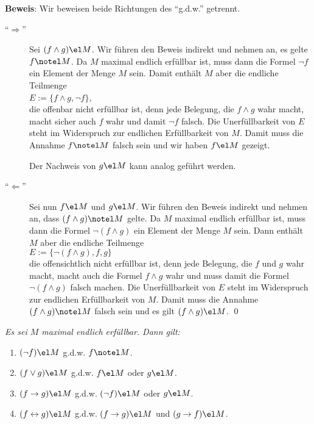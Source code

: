 \noindent
\textbf{Beweis}: Wir beweisen beide Richtungen des ``g.d.w.'' getrennt.
\begin{description}
\item[``$\Rightarrow$''] Sei $(f \wedge g) \el M$.  Wir f\"{u}hren den Beweis indirekt und
  nehmen an, es gelte $f \notel M$. Da
  $M$ maximal endlich erf\"{u}llbar ist, muss dann die Formel $\neg f$ ein Element der Menge
  $M$ sein.  Damit enth\"{a}lt $M$ aber die endliche Teilmenge 
  \\[0.2cm]
  \hspace*{1.3cm}
  $E := \{ f \wedge g, \neg f\}$, 
  \\[0.2cm]
  die offenbar nicht erf\"{u}llbar ist, denn jede Belegung, die $f \wedge g$ wahr macht, macht
  sicher auch $f$ wahr und damit $\neg f$ falsch.  Die Unerf\"{u}llbarkeit von $E$ steht im
  Widerspruch zur endlichen Erf\"{u}llbarkeit von $M$.  Damit muss die Annahme $f \notel M$
  falsch sein und wir haben $f \el M$ gezeigt. 

  Der Nachweis von $g \el M$ kann analog gef\"{u}hrt werden.
\item[``$\Leftarrow$''] Sei nun $f \el M$ und $g \el M$.  
  Wir f\"{u}hren den Beweis indirekt und nehmen an, dass $(f \wedge g) \notel M$ gelte.  Da $M$
  maximal endlich erf\"{u}llbar ist, muss dann die Formel $\neg (f \wedge g)$ ein Element der
  Menge $M$ sein.  Dann enth\"{a}lt $M$ aber die endliche Teilmenge
  \\[0.2cm]
  \hspace*{1.3cm}
  $E := \{ \neg (f \wedge g), f, g \}$
  \\[0.2cm]
  die offensichtlich nicht erf\"{u}llbar ist, denn jede Belegung, die $f$ und $g$ wahr macht,
  macht auch die Formel $f \wedge g$ wahr und muss damit die Formel $\neg (f \wedge g)$
  falsch machen.  Die Unerf\"{u}llbarkeit von $E$ steht im Widerspruch zur endlichen
  Erf\"{u}llbarkeit von $M$.  Damit muss die Annahme $(f \wedge g) \notel M$ falsch sein und
  es gilt $(f \wedge g) \el M$. \qed
\end{description}

\begin{Satz} \label{satz29}
{\em
  Es sei $M$ maximal endlich erf\"{u}llbar. Dann gilt:
  \begin{enumerate}
  \item $(\neg f) \el M$ \quad g.d.w. $f \notel M$.
  \item $(f \vee g) \el M$ \quad g.d.w. $f \el M$ oder $g \el M$.
  \item $(f \rightarrow g) \el M$ \quad g.d.w. $(\neg f) \el M$ oder $g \el M$.
  \item $(f \leftrightarrow g) \el M$ \quad g.d.w. 
        $(f \rightarrow g) \el M$ und $(g \rightarrow f) \el M$.
  \end{enumerate}
}
\end{Satz}

